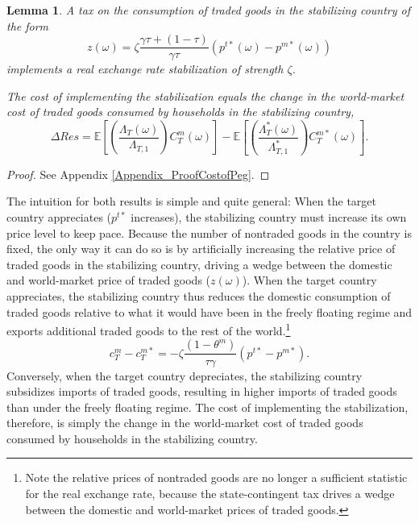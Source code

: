 \documentclass[12pt,letter]{article}
\theoremstyle{break} \theorembodyfont{\normalfont\itshape}
\theoremstyle{break}
\theoremstyle{break} \theorembodyfont{\normalfont\itshape}
\newtheorem{lemma}{Lemma} \theoremstyle{break}
\theoremstyle{break} \theorembodyfont{\normalfont\itshape}
\begin{document}
\begin{lemma}
  A tax on the consumption of traded goods in the stabilizing country
  of the form
  \begin{equation*}
    z(\omega)
    = \zeta \frac{\gamma \tau + (1 - \tau)}{\gamma \tau}(p^{t*}(\omega)-p^{m*}(\omega))
  \end{equation*}
  implements a real exchange rate stabilization of strength $\zeta$.

  The cost of implementing the stabilization equals the change in the
  world-market cost of traded goods consumed by households in the
  stabilizing country,
  \begin{equation}\label{eq:kappacost}
    \Delta Res = 
    \mathbb{E}\left[ \left( \frac{\Lambda_T(\omega)}{\Lambda_{T, 1}} \right) 
      C_{T}^m(\omega) \right] - 
    \mathbb{E}\left[ \left( \frac{\Lambda^{\ast}_T(\omega)}{\Lambda^{\ast}_{T, 1}} \right) 
      C_{T}^{m \ast}(\omega) \right].
  \end{equation}
  \label{lemma:CostofPeg}\end{lemma}
\begin{proof}
  See Appendix \ref{Appendix_ProofCostofPeg}.
\end{proof}

The intuition for both results is simple and quite general: When the
target country appreciates (\(p^{t*}\) increases), the stabilizing
country must increase its own price level to keep pace. Because the
number of nontraded goods in the country is fixed, the only way it can
do so is by artificially increasing the relative price of traded goods
in the stabilizing country, driving a wedge between the domestic and
world-market price of traded goods (\(z(\omega )\)). When the target
country appreciates, the stabilizing country thus reduces the domestic
consumption of traded goods relative to what it would have been in the
freely floating regime and exports additional traded goods to the rest
of the world.\footnote{Note the relative prices of nontraded goods are
  no longer a sufficient statistic for the real exchange rate, because
  the state-contingent tax drives a wedge between the domestic and
  world-market prices of traded goods. }
\begin{equation}
  c_{T}^m- c_{T}^{m \ast} =  
  -\zeta \frac{(1 - \theta^m)}{\tau \gamma} 
  \left(p^{t*} - p^{m*}\right).
  \label{eqn:cTp}
\end{equation}
Conversely, when the target country depreciates, the stabilizing
country subsidizes imports of traded goods, resulting in higher
imports of traded goods than under the freely floating regime. The
cost of implementing the stabilization, therefore, is simply the
change in the world-market cost of traded goods consumed by households
in the stabilizing country.
\end{document}

